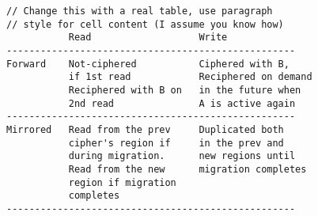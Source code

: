 


\begin{table}[t]
\begin{center}
\scriptsize
\centering
\begin{verbatim}
// Change this with a real table, use paragraph
// style for cell content (I assume you know how)
           Read                   Write
---------------------------------------------------
Forward    Not-ciphered           Ciphered with B,
           if 1st read            Reciphered on demand
           Reciphered with B on   in the future when 
           2nd read               A is active again
---------------------------------------------------
Mirrored   Read from the prev     Duplicated both 
           cipher's region if     in the prev and 
           during migration.      new regions until 
           Read from the new      migration completes
           region if migration 
           completes
---------------------------------------------------

\end{verbatim}
\end{center}
\end{table}


